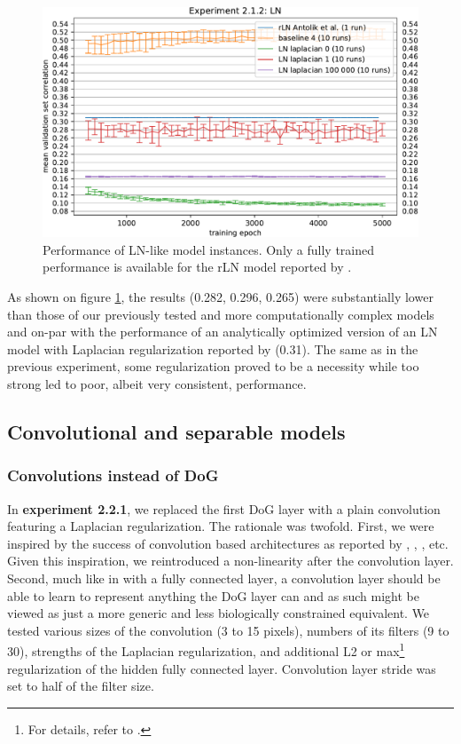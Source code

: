 \begin{figure}[H]
    \centering
    \includegraphics[width=1\textwidth]{../figures/05_2_1_2}
    \caption[Experiment 2.1.2]{Performance of LN-like model instances. Only a fully trained performance is available for the rLN model reported by \citeauthor{antolik}\protect\footnotemark.}
    \label{fig:5.2.1.2}
\end{figure}

As shown on figure \ref{fig:5.2.1.2}, the results (0.282, 0.296, 0.265) were substantially lower than those of our previously tested and more computationally complex models and on-par with the performance of an analytically optimized version of an LN model with Laplacian regularization reported by \cite{antolik} (0.31). The same as in the previous experiment, some regularization proved to be a necessity while too strong led to poor, albeit very consistent, performance.

\subsection{Convolutional and separable models}
\subsubsection{Convolutions instead of DoG}\label{ex:2.2.1}

In \textbf{experiment 2.2.1}, we replaced the first DoG layer with a plain convolution featuring a Laplacian regularization. The rationale was twofold. First, we were inspired by the success of convolution based architectures as reported by \cite{klindt}, \cite{ecker}, \cite{Walke506956}, etc. Given this inspiration, we reintroduced a non-linearity after the convolution layer. Second, much like in  with a fully connected layer, a convolution layer should be able to learn to represent anything the DoG layer can and as such might be viewed as just a more generic and less biologically constrained equivalent. We tested various sizes of the convolution (3 to 15 pixels), numbers of its filters (9 to 30), strengths of the Laplacian regularization, and additional L2 or max\footnote{For details, refer to .} regularization of the hidden fully connected layer. Convolution layer stride was set to half of the filter size.

